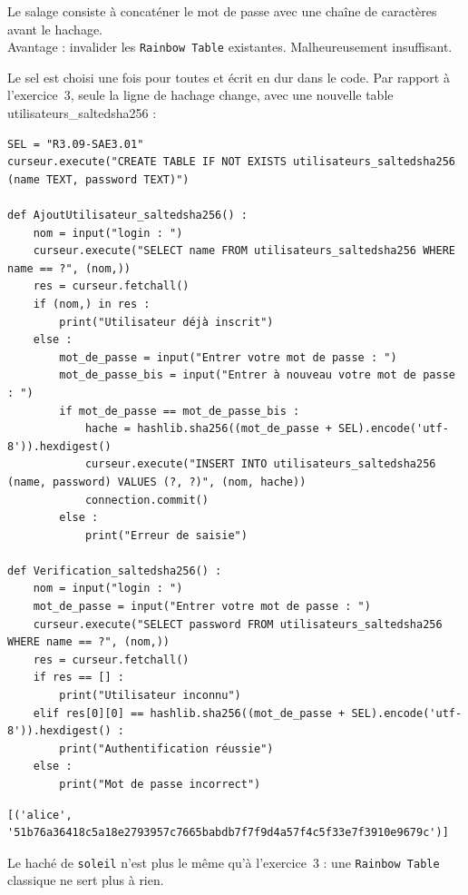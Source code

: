 \documentclass[11pt,a4paper]{article}
\newcommand{\code}[1]{\colorbox{fondcode}{\ttfamily\small #1}}
\begin{document}
\begin{rappel}
Le salage consiste à concaténer le mot de passe avec une chaîne de caractères avant le hachage. \\
Avantage : invalider les \texttt{Rainbow Table} existantes. Malheureusement insuffisant.
\end{rappel}

Le sel est choisi une fois pour toutes et écrit en dur dans le code. Par rapport à l'exercice~3, seule la ligne de hachage change, avec une nouvelle table \code{utilisateurs\_saltedsha256} :

\begin{lstlisting}
SEL = "R3.09-SAE3.01"
curseur.execute("CREATE TABLE IF NOT EXISTS utilisateurs_saltedsha256 (name TEXT, password TEXT)")

def AjoutUtilisateur_saltedsha256() :
    nom = input("login : ")
    curseur.execute("SELECT name FROM utilisateurs_saltedsha256 WHERE name == ?", (nom,))
    res = curseur.fetchall()
    if (nom,) in res :
        print("Utilisateur déjà inscrit")
    else :
        mot_de_passe = input("Entrer votre mot de passe : ")
        mot_de_passe_bis = input("Entrer à nouveau votre mot de passe : ")
        if mot_de_passe == mot_de_passe_bis :
            hache = hashlib.sha256((mot_de_passe + SEL).encode('utf-8')).hexdigest()
            curseur.execute("INSERT INTO utilisateurs_saltedsha256 (name, password) VALUES (?, ?)", (nom, hache))
            connection.commit()
        else :
            print("Erreur de saisie")

def Verification_saltedsha256() :
    nom = input("login : ")
    mot_de_passe = input("Entrer votre mot de passe : ")
    curseur.execute("SELECT password FROM utilisateurs_saltedsha256 WHERE name == ?", (nom,))
    res = curseur.fetchall()
    if res == [] :
        print("Utilisateur inconnu")
    elif res[0][0] == hashlib.sha256((mot_de_passe + SEL).encode('utf-8')).hexdigest() :
        print("Authentification réussie")
    else :
        print("Mot de passe incorrect")
\end{lstlisting}

\begin{lstlisting}[style=sortie]
[('alice', '51b76a36418c5a18e2793957c7665babdb7f7f9d4a57f4c5f33e7f3910e9679c')]
\end{lstlisting}

Le haché de \texttt{soleil} n'est plus le même qu'à l'exercice~3 : une \texttt{Rainbow Table} \og classique \fg{} ne sert plus à rien.
\end{document}
